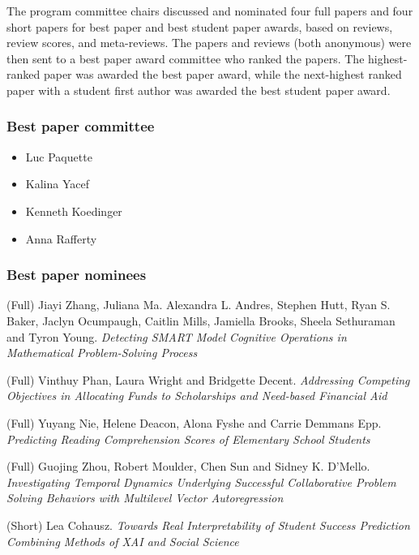 \documentclass[letterpaper,11pt,oneside]{book} %
\providecommand{\tightlist}{%
  \setlength{\itemsep}{0pt}\setlength{\parskip}{0pt}}
\begin{document}
\vspace*{.5cm}

The program committee chairs discussed and nominated four full papers
and four short papers for best paper and best student paper awards,
based on reviews, review scores, and meta-reviews. The papers and
reviews (both anonymous) were then sent to a best paper award committee
who ranked the papers. The highest-ranked paper was awarded the best
paper award, while the next-highest ranked paper with a student first
author was awarded the best student paper award.

\hypertarget{best-paper-committee}{%
\subsubsection{Best paper committee}\label{best-paper-committee}}

\begin{itemize}
\tightlist
\item
  Luc Paquette
\item
  Kalina Yacef
\item
  Kenneth Koedinger
\item
  Anna Rafferty
\end{itemize}

\hypertarget{best-paper-nominees}{%
\subsubsection{Best paper nominees}\label{best-paper-nominees}}

(Full) Jiayi Zhang, Juliana Ma. Alexandra L. Andres, Stephen Hutt, Ryan
S. Baker, Jaclyn Ocumpaugh, Caitlin Mills, Jamiella Brooks, Sheela
Sethuraman and Tyron Young. \emph{Detecting SMART Model Cognitive
Operations in Mathematical Problem-Solving Process}

(Full) Vinthuy Phan, Laura Wright and Bridgette Decent. \emph{Addressing
Competing Objectives in Allocating Funds to Scholarships and Need-based
Financial Aid}

(Full) Yuyang Nie, Helene Deacon, Alona Fyshe and Carrie Demmans Epp.
\emph{Predicting Reading Comprehension Scores of Elementary School
Students}

(Full) Guojing Zhou, Robert Moulder, Chen Sun and Sidney K. D'Mello.
\emph{Investigating Temporal Dynamics Underlying Successful
Collaborative Problem Solving Behaviors with Multilevel Vector
Autoregression}

(Short) Lea Cohausz. \emph{Towards Real Interpretability of Student
Success Prediction Combining Methods of XAI and Social Science}
\end{document}
